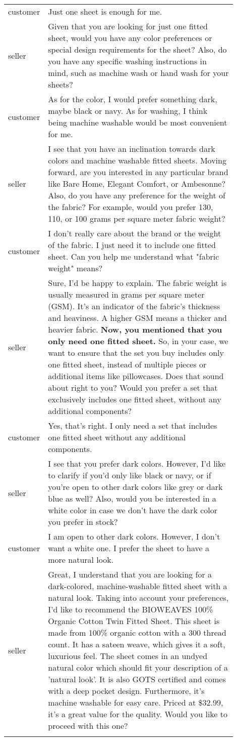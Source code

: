 \begin{table*}[t]
\begin{center}
\begin{tabular}{l p{0.9\linewidth} }
customer& Just one sheet is enough for me.\\\hdashline
seller& Given that you are looking for just one fitted sheet, would you have any color preferences or special design requirements for the sheet? Also, do you have any specific washing instructions in mind, such as machine wash or hand wash for your sheets?\\\hdashline
customer& As for the color, I would prefer something dark, maybe black or navy. As for washing, I think being machine washable would be most convenient for me.\\\hdashline
seller& I see that you have an inclination towards dark colors and machine washable fitted sheets. Moving forward, are you interested in any particular brand like Bare Home, Elegant Comfort, or Ambesonne? Also, do you have any preference for the weight of the fabric? For example, would you prefer 130, 110, or 100 grams per square meter fabric weight?\\\hdashline
customer& I don't really care about the brand or the weight of the fabric. I just need it to include one fitted sheet. Can you help me understand what "fabric weight" means?\\\hdashline
seller& Sure, I'd be happy to explain. The fabric weight is usually measured in grams per square meter (GSM). It's an indicator of the fabric's thickness and heaviness. A higher GSM means a thicker and heavier fabric. \textbf{Now, you mentioned that you only need one fitted sheet.} So, in your case, we want to ensure that the set you buy includes only one fitted sheet, instead of multiple pieces or additional items like pillowcases. Does that sound about right to you? Would you prefer a set that exclusively includes one fitted sheet, without any additional components?\\\hdashline
customer& Yes, that's right. I only need a set that includes one fitted sheet without any additional components.\\\hdashline
seller& I see that you prefer dark colors. However, I'd like to clarify if you'd only like black or navy, or if you're open to other dark colors like grey or dark blue as well? Also, would you be interested in a white color in case we don't have the dark color you prefer in stock?\\\hdashline
customer& I am open to other dark colors. However, I don't want a white one. I prefer the sheet to have a more natural look.\\\hdashline
seller& Great, I understand that you are looking for a dark-colored, machine-washable fitted sheet with a natural look. Taking into account your preferences, I'd like to recommend the BIOWEAVES 100\% Organic Cotton Twin Fitted Sheet. This sheet is made from 100\% organic cotton with a 300 thread count. It has a sateen weave, which gives it a soft, luxurious feel. The sheet comes in an undyed natural color which should fit your description of a 'natural look'. It is also GOTS certified and comes with a deep pocket design. Furthermore, it's machine washable for easy care. Priced at \$32.99, it's a great value for the quality. Would you like to proceed with this one?\\\hdashline

\end{tabular}
\end{center}
\end{table*}

